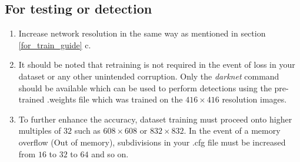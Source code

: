 \subsection{For testing or detection}

\begin{enumerate}
  \item Increase network resolution in the same way as mentioned in
    section \ref{for_train_guide} c.
  \item It should be noted that retraining is not required in the
    event of loss in your dataset or any other unintended corruption.
    Only the \textit{darknet} command should be available which can
    be used to perform detections using the pre-trained
    {\selectfont .weights} file which was trained on
    the $416 \times 416$ resolution images.
  \item To further enhance the accuracy, dataset training must
    proceed onto higher multiples of  $32$ such as $608 \times 608$
    or $832 \times 832$. In the event of a memory overflow
    ({\selectfont Out of memory}),
    {\selectfont subdivisions} in your
    {\selectfont .cfg} file must be increased from
    $16$ to $32$ to $64$ and so on.
\end{enumerate}
